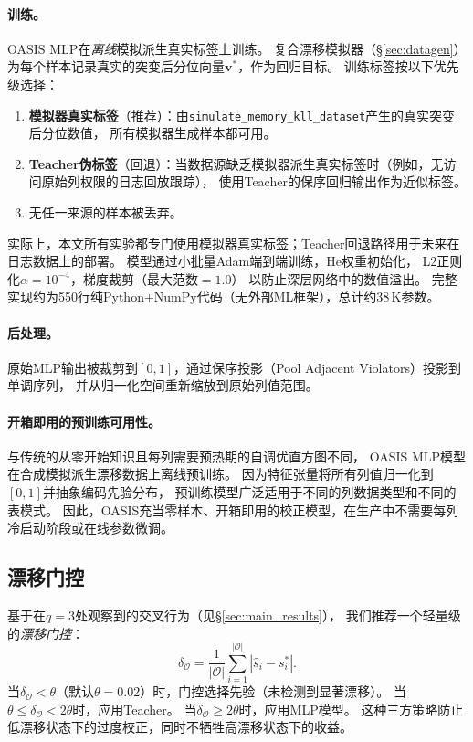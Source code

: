 \documentclass[runningheads]{llncs}
\begin{document}
\paragraph{训练。}
OASIS MLP在\emph{离线}模拟派生真实标签上训练。
复合漂移模拟器（\S\ref{sec:datagen}）为每个样本记录真实的突变后分位向量$\mathbf{v}^*$，作为回归目标。
训练标签按以下优先级选择：
\begin{enumerate}
  \item \textbf{模拟器真实标签}（推荐）：由\texttt{simulate\_memory\_kll\_dataset}产生的真实突变后分位数值，
        所有模拟器生成样本都可用。
  \item \textbf{Teacher伪标签}（回退）：当数据源缺乏模拟器派生真实标签时（例如，无访问原始列权限的日志回放跟踪），
        使用Teacher的保序回归输出作为近似标签。
  \item 无任一来源的样本被丢弃。
\end{enumerate}
\noindent
实际上，本文所有实验都专门使用模拟器真实标签；Teacher回退路径用于未来在日志数据上的部署。
模型通过小批量Adam端到端训练，He权重初始化，
L2正则化$\alpha{=}10^{-4}$，梯度裁剪（最大范数$= 1.0$）
以防止深层网络中的数值溢出。
完整实现约为550行纯Python+NumPy代码（无外部ML框架），总计约38\,K参数。

\paragraph{后处理。}
原始MLP输出被裁剪到$[0,1]$，通过保序投影（Pool Adjacent Violators）投影到单调序列，
并从归一化空间重新缩放到原始列值范围。

\paragraph{开箱即用的预训练可用性。}
与传统的从零开始知识且每列需要预热期的自调优直方图不同，
OASIS MLP模型在合成模拟派生漂移数据上离线预训练。
因为特征张量将所有列值归一化到$[0,1]$并抽象编码先验分布，
预训练模型广泛适用于不同的列数据类型和不同的表模式。
因此，OASIS充当零样本、开箱即用的校正模型，在生产中不需要每列冷启动阶段或在线参数微调。

\subsection{漂移门控}
\label{sec:gate}

基于在$q{=}3$处观察到的交叉行为（见\S\ref{sec:main_results}），
我们推荐一个轻量级的\emph{漂移门控}：
\begin{equation}
  \delta_{\mathcal{O}} =
  \frac{1}{|\mathcal{O}|}\sum_{i=1}^{|\mathcal{O}|}
  |\hat{s}_i - s^*_i|.
\end{equation}
当$\delta_{\mathcal{O}} < \theta$（默认$\theta = 0.02$）时，门控选择先验（未检测到显著漂移）。
当$\theta \leq \delta_{\mathcal{O}} < 2\theta$时，应用Teacher。
当$\delta_{\mathcal{O}} \geq 2\theta$时，应用MLP模型。
这种三方策略防止低漂移状态下的过度校正，同时不牺牲高漂移状态下的收益。
\end{document}
